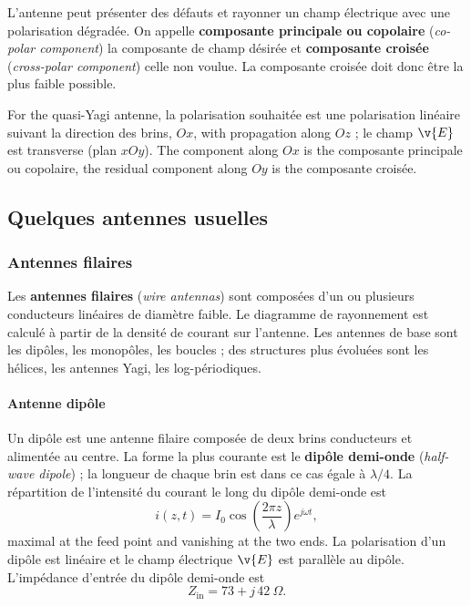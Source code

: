 \begin{definition}
  L'antenne peut présenter des défauts et rayonner un champ électrique avec une
  polarisation dégradée. On appelle \textbf{composante principale ou copolaire}
  (\textit{co-polar component}) la composante de champ désirée et
  \textbf{composante croisée} (\textit{cross-polar component}) celle non
  voulue. La composante croisée doit donc être la plus faible possible.
\end{definition}

\begin{example}
  For the quasi-Yagi antenne, la polarisation souhaitée est une polarisation
  linéaire suivant la direction des brins, $Ox$, with propagation along $Oz$ ;
  le champ $\v{E}$ est transverse (plan $xOy$). The component along $Ox$ is the
  composante principale ou copolaire, the residual component along $Oy$ is the
  composante croisée.
\end{example}

\subsection{Quelques antennes usuelles}

\subsubsection{Antennes filaires}

Les \textbf{antennes filaires} (\textit{wire antennas}) sont composées d'un ou
plusieurs conducteurs linéaires de diamètre faible. Le diagramme de rayonnement
est calculé à partir de la densité de courant sur l'antenne. Les antennes de
base sont les dipôles, les monopôles, les boucles ; des structures plus
évoluées sont les hélices, les antennes Yagi, les log-périodiques.

\paragraph{Antenne dipôle} Un dipôle est une antenne filaire composée de deux
brins conducteurs et alimentée au centre. La forme la plus courante est le
\textbf{dipôle demi-onde} (\textit{half-wave dipole}) ; la longueur de chaque
brin est dans ce cas égale à $\lambda/4$. La répartition de l'intensité du
courant le long du dipôle demi-onde est
\[ i(z,t) = I_0 \cos\!\left(\frac{2\pi z}{\lambda}\right) e^{j \omega t}, \]
maximal at the feed point and vanishing at the two ends. La polarisation d'un
dipôle est linéaire et le champ électrique $\v{E}$ est parallèle au dipôle.
L'impédance d'entrée du dipôle demi-onde est
\[ Z_{\mathrm{in}} = 73 + j\,42\ \Omega. \]

